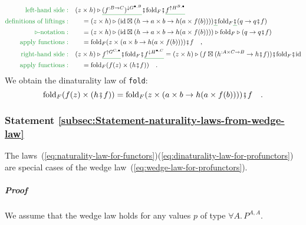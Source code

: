 \begin{align*}
{\color{greenunder}\text{left-hand side}:}\quad & (z\times h)\triangleright\gunderline{(f^{:B\rightarrow C})^{\downarrow G^{\bullet,B}}}\bef\text{fold}_{F}\bef\gunderline{f^{\uparrow H^{B,\bullet}}}\\
{\color{greenunder}\text{definitions of liftings}:}\quad & \quad=(z\times h)\triangleright(\text{id}\boxtimes(h\rightarrow a\times b\rightarrow h(a\times f(b))))\gunderline{\bef}\text{fold}_{F}\gunderline{\bef}(q\rightarrow q\bef f)\\
{\color{greenunder}\triangleright\text{-notation}:}\quad & \quad=(z\times h)\triangleright(\text{id}\boxtimes(h\rightarrow a\times b\rightarrow h(a\times f(b))))\triangleright\text{fold}_{F}\triangleright(q\rightarrow q\bef f)\\
{\color{greenunder}\text{apply functions}:}\quad & \quad=\text{fold}_{F}(z\times(a\times b\rightarrow h(a\times f(b))))\bef f\quad,\\
{\color{greenunder}\text{right-hand side}:}\quad & (z\times h)\triangleright\gunderline{f^{\uparrow G^{C,\bullet}}}\bef\text{fold}_{F}\bef\gunderline{f^{\downarrow H^{\bullet,C}}}=(z\times h)\triangleright(f\boxtimes(h^{:A\times C\rightarrow B}\rightarrow h\bef f))\bef\text{fold}_{F}\bef\text{id}\\
{\color{greenunder}\text{apply functions}:}\quad & \quad=\text{fold}_{F}(f(z)\times(h\bef f))\quad.
\end{align*}
We obtain the dinaturality law of \lstinline!fold!:
\[
\text{fold}_{F}(f(z)\times(h\bef f))=\text{fold}_{F}(z\times(a\times b\rightarrow h(a\times f(b))))\bef f\quad.
\]


\subsubsection{Statement \label{subsec:Statement-naturality-laws-from-wedge-law}\ref{subsec:Statement-naturality-laws-from-wedge-law}}

The laws~(\ref{eq:naturality-law-for-functors})\textendash (\ref{eq:dinaturality-law-for-profunctors})
are special cases of the wedge law~(\ref{eq:wedge-law-for-profunctors}). 

\subparagraph{Proof}

We assume that the wedge law holds for any values $p$ of type $\forall A.\,P^{A,A}$.

